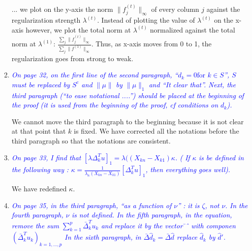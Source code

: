 \documentclass[pdftex,12pt]{article}
\let\hat\widehat
\def\rc#1{{\it\textcolor{blue}{#1}}\smallskip}
\begin{document}
\begin{enumerate}
... we plot on the y-axis the norm $\|f^{(t)}_j\|_{\infty}$ of every column $j$ against the regularization strength $\lambda^{(t)}$. Instead of plotting the value of $\lambda^{(t)}$ on the x-axis however, we plot the total norm at $\lambda^{(t)}$ normalized against the total norm at $\lambda^{(1)}$: $\frac{\sum_j \|f^{(t)}_j\|_{\infty}}{\sum_j \|f^{(1)}\|_{\infty}}$. Thus, as x-axis moves from 0 to 1, the regularization goes from strong to weak.


\item \rc{On page 32, on the first line of the second paragraph, ``$d_k = 0 \mbox{for $k
\in S$}$'', $S$ must be replaced by $S^c$ and $\|\mu\|$ by $\|\mu\|_1$ and ``It clear
that''. Next, the third paragraph (``to ease notational ....'') should
be placed at the beginning of the proof (it is used from the beginning
of the proof, cf conditions on $d_k$).}

We cannot move the third paragraph to the beginning because it is not clear at that point that $k$ is fixed. We have corrected all the notations before the third paragraph so that the notations are consistent.

\item \rc{On page 33, I find that $[\lambda\Delta_k^Tu]_1 = \lambda((X_{kn} −X_{k1})\kappa$. ( If $\kappa$ is be defined
in the following way : $\kappa = \frac{1}{\lambda_n(X_{kn}-X_{k1})}[\Delta_k^T u]_1$, then everything
goes well).}

We have redefined $\kappa$. 



\item \rc{On page 35, in the third paragraph, ``as a function of $\nu$'' : it is
$\zeta$, not $\nu$. In the fourth paragraph, $\nu$ is not defined. In the fifth
paragraph, in the equation, remove the sum $\sum_{k=1}^p
\bar\Delta_k^T u_k$  and replace
it by the vector ̄ˆ with componen$(\bar\Delta_k^T u_k)_{k=1,\ldots, p}$ In the sixth paragraph,
in $\bar\Delta \hat d_k = \bar\Delta\hat d$ replace $\hat d_k$ by
$\hat d'$.}


\end{enumerate}
\end{document}
